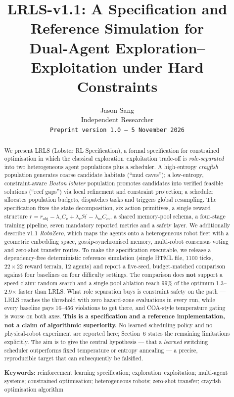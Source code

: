 \documentclass[11pt,a4paper]{article}
\title{LRLS-v1.1: A Specification and Reference Simulation for\\
Dual-Agent Exploration--Exploitation under Hard Constraints}
\author{Jason Sang\\
\small Independent Researcher\\
\small \texttt{Preprint version 1.0 --- 5 November 2026}}
\date{}
\begin{document}
\maketitle

\begin{abstract}
\noindent We present LRLS (Lobster RL Specification), a formal specification for constrained optimisation in which the classical exploration--exploitation trade-off is \emph{role-separated} into two heterogeneous agent populations plus a scheduler. A high-entropy \emph{crayfish} population generates coarse candidate habitats (``mud caves''); a low-entropy, constraint-aware \emph{Boston lobster} population promotes candidates into verified feasible solutions (``reef gaps'') via local refinement and constraint projection; a scheduler allocates population budgets, dispatches tasks and triggers global resampling. The specification fixes the state decomposition, six action primitives, a single reward structure $r = r_{\mathrm{obj}} - \lambda_v C_v + \lambda_e \mathcal{H} - \lambda_m C_m$, a shared memory-pool schema, a four-stage training pipeline, seven mandatory reported metrics and a safety layer. We additionally describe v1.1 \emph{RoboZero}, which maps the agents onto a heterogeneous robot fleet with a geometric embedding space, gossip-synchronised memory, multi-robot consensus voting and zero-shot transfer routes. To make the specification executable, we release a dependency-free deterministic reference simulation (single HTML file, 1100 ticks, $22\times22$ reward terrain, 12 agents) and report a five-seed, budget-matched comparison against four baselines on four difficulty settings. The comparison does \textbf{not} support a speed claim: random search and a single-pool ablation reach 99\% of the optimum 1.3--2.9$\times$ faster than LRLS. What role separation buys is constraint safety on the path --- LRLS reaches the threshold with zero hazard-zone evaluations in every run, while every baseline pays 16--456 violations to get there, and COA-style temperature gating is worse on both axes. \textbf{This is a specification and a reference implementation, not a claim of algorithmic superiority.} No learned scheduling policy and no physical-robot experiment are reported here; Section~6 states the remaining limitations explicitly. The aim is to give the central hypothesis --- that a \emph{learned} switching scheduler outperforms fixed temperature or entropy annealing --- a precise, reproducible target that can subsequently be falsified.

\smallskip
\noindent\textbf{Keywords:} reinforcement learning specification; exploration--exploitation; multi-agent systems; constrained optimisation; heterogeneous robots; zero-shot transfer; crayfish optimisation algorithm
\end{abstract}
\end{document}
